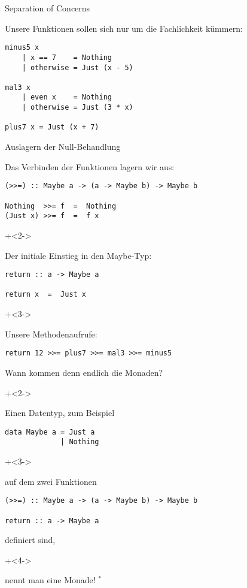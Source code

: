 \begin{frame}[fragile]{Separation of Concerns}

Unsere Funktionen sollen sich nur um die Fachlichkeit kümmern:

\begin{lstlisting}
minus5 x
    | x == 7    = Nothing
    | otherwise = Just (x - 5)

mal3 x
    | even x    = Nothing
    | otherwise = Just (3 * x)

plus7 x = Just (x + 7)
\end{lstlisting}
\end{frame}

\begin{frame}[fragile]{Auslagern der Null-Behandlung}

Das Verbinden der Funktionen lagern wir aus:
\begin{lstlisting}
(>>=) :: Maybe a -> (a -> Maybe b) -> Maybe b

Nothing  >>= f  =  Nothing
(Just x) >>= f  =  f x
\end{lstlisting}

\onslide+<2->
~

Der initiale Einstieg in den Maybe-Typ:

\begin{lstlisting}
return :: a -> Maybe a

return x  =  Just x
\end{lstlisting}

\onslide+<3->
~

Unsere Methodenaufrufe:

\begin{lstlisting}
return 12 >>= plus7 >>= mal3 >>= minus5
\end{lstlisting}

\end{frame}


\begin{frame}[fragile]{Wann kommen denn endlich die Monaden?}

\onslide+<2->

Einen Datentyp, zum Beispiel

\begin{lstlisting}
data Maybe a = Just a
             | Nothing
\end{lstlisting}

\onslide+<3->
~

auf dem zwei Funktionen

\begin{lstlisting}
(>>=) :: Maybe a -> (a -> Maybe b) -> Maybe b

return :: a -> Maybe a
\end{lstlisting}

definiert sind,

\onslide+<4->
~

nennt man eine Monade! $^\ast$

\end{frame}

